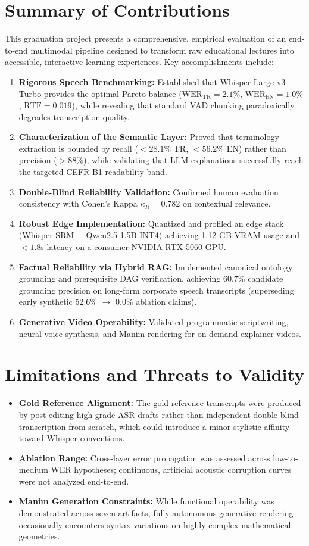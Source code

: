 \documentclass[a4paper,12pt]{report}
\begin{document}
\section{Summary of Contributions}
This graduation project presents a comprehensive, empirical evaluation of an end-to-end multimodal pipeline designed to transform raw educational lectures into accessible, interactive learning experiences. Key accomplishments include:
\begin{enumerate}
    \item \textbf{Rigorous Speech Benchmarking:} Established that Whisper Large-v3 Turbo provides the optimal Pareto balance ($\text{WER}_{\text{TR}} = 2.1\%$, $\text{WER}_{\text{EN}} = 1.0\%$, $\text{RTF} = 0.019$), while revealing that standard VAD chunking paradoxically degrades transcription quality.
    \item \textbf{Characterization of the Semantic Layer:} Proved that terminology extraction is bounded by recall ($<28.1\%$ TR, $<56.2\%$ EN) rather than precision ($>88\%$), while validating that LLM explanations successfully reach the targeted CEFR-B1 readability band.
    \item \textbf{Double-Blind Reliability Validation:} Confirmed human evaluation consistency with Cohen's Kappa $\kappa_R = 0.782$ on contextual relevance.
    \item \textbf{Robust Edge Implementation:} Quantized and profiled an edge stack (Whisper SRM + Qwen2.5-1.5B INT4) achieving 1.12 GB VRAM usage and $<1.8$s latency on a consumer NVIDIA RTX 5060 GPU.
    \item \textbf{Factual Reliability via Hybrid RAG:} Implemented canonical ontology grounding and prerequisite DAG verification, achieving 60.7\% candidate grounding precision on long-form corporate speech transcripts (superseding early synthetic 52.6\% $\to$ 0.0\% ablation claims).
    \item \textbf{Generative Video Operability:} Validated programmatic scriptwriting, neural voice synthesis, and Manim rendering for on-demand explainer videos.
\end{enumerate}

\section{Limitations and Threats to Validity}
\begin{itemize}
    \item \textbf{Gold Reference Alignment:} The gold reference transcripts were produced by post-editing high-grade ASR drafts rather than independent double-blind transcription from scratch, which could introduce a minor stylistic affinity toward Whisper conventions.
    \item \textbf{Ablation Range:} Cross-layer error propagation was assessed across low-to-medium WER hypotheses; continuous, artificial acoustic corruption curves were not analyzed end-to-end.
    \item \textbf{Manim Generation Constraints:} While functional operability was demonstrated across seven artifacts, fully autonomous generative rendering occasionally encounters syntax variations on highly complex mathematical geometries.
\end{itemize}
\end{document}
